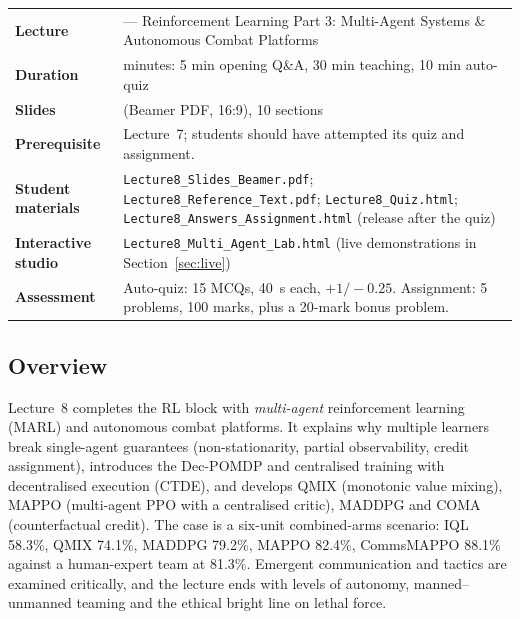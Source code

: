 \documentclass[11pt]{article}
\begin{document}
\begin{center}\small\renewcommand{\arraystretch}{1.25}\begin{tabularx}{\textwidth}{@{}>{\bfseries}p{3.3cm}>{\raggedright\arraybackslash}X@{}}\toprule

\textcolor{NavyN}{Lecture}&8 --- Reinforcement Learning Part 3: Multi-Agent Systems \& Autonomous Combat Platforms\\
\textcolor{NavyN}{Duration}&45 minutes: 5 min opening Q\&A, 30 min teaching, 10 min auto-quiz\\
\textcolor{NavyN}{Slides}&20 (Beamer PDF, 16:9), 10 sections\\
\textcolor{NavyN}{Prerequisite}&Lecture~7; students should have attempted its quiz and assignment.\\
\textcolor{NavyN}{Student materials}&\texttt{Lecture8\_Slides\_Beamer.pdf}; \texttt{Lecture8\_Reference\_Text.pdf}; \texttt{Lecture8\_Quiz.html}; \texttt{Lecture8\_Answers\_Assignment.html} (release after the quiz)\\
\textcolor{NavyN}{Interactive studio}&\texttt{Lecture8\_Multi\_Agent\_Lab.html} (live demonstrations in Section~\ref{sec:live})\\
\textcolor{NavyN}{Assessment}&Auto-quiz: 15 MCQs, 40~s each, $+1/-0.25$. Assignment: 5 problems, 100 marks, plus a 20-mark bonus problem.\\\bottomrule\end{tabularx}\end{center}

\subsection*{Overview}Lecture~8 completes the RL block with \emph{multi-agent} reinforcement learning (MARL) and autonomous combat platforms. It explains why multiple learners break single-agent guarantees (non-stationarity, partial observability, credit assignment), introduces the Dec-POMDP and centralised training with decentralised execution (CTDE), and develops QMIX (monotonic value mixing), MAPPO (multi-agent PPO with a centralised critic), MADDPG and COMA (counterfactual credit). The case is a six-unit combined-arms scenario: IQL 58.3\%, QMIX 74.1\%, MADDPG 79.2\%, MAPPO 82.4\%, CommsMAPPO 88.1\% against a human-expert team at 81.3\%. Emergent communication and tactics are examined critically, and the lecture ends with levels of autonomy, manned--unmanned teaming and the ethical bright line on lethal force.
\end{document}
